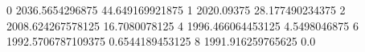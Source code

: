 0 2036.5654296875 44.649169921875
1 2020.09375 28.177490234375
2 2008.624267578125 16.7080078125
4 1996.466064453125 4.5498046875
6 1992.5706787109375 0.6544189453125
8 1991.916259765625 0.0

